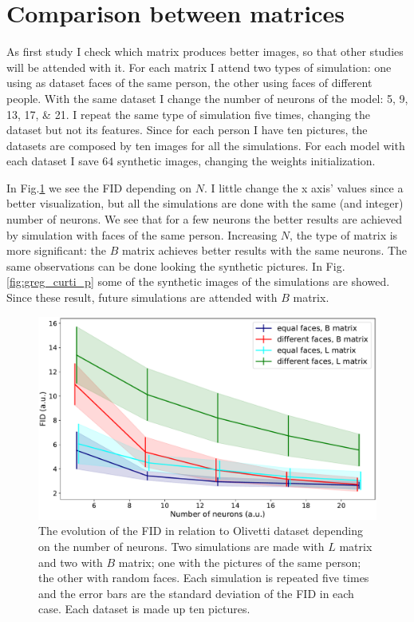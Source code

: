 \documentclass[a4paper,12pt]{article}
\begin{document}
\section{Comparison between matrices}
As first study I check which matrix produces better images, so that other studies will be attended with it.
For each matrix I attend two types of simulation: one using as dataset faces of the same person, the other using faces of different people.
With the same dataset I change the number of neurons of the model: \numlist{5;9;13;17;21}.
I repeat the same type of simulation five times, changing the dataset but not its features.
Since for each person I have ten pictures, the datasets are composed by ten images for all the simulations.
For each model with each dataset I save $64$ synthetic images, changing the weights initialization.

In Fig.\ref{fig:greg_curti_g} we see the FID depending on $N$.
I little change the x axis' values since a better visualization, but all the simulations are done with the same (and integer) number of neurons.
We see that for a few neurons the better results are achieved by simulation with faces of the same person.
Increasing $N$, the type of matrix is more significant: the $B$ matrix achieves better results with the same neurons.
The same observations can be done looking the synthetic pictures.
In Fig.\ref{fig:greg_curti_p} some of the synthetic images of the simulations are showed.
Since these result, future simulations are attended with $B$ matrix.

\begin{figure}[!hbt]
  \centering
  \includegraphics[width=.9\columnwidth]{greg_curti.pdf}
  \caption[FID of $L$ versus $B$ matrix]{The evolution of the FID in relation to Olivetti dataset depending on the number of neurons.
  Two simulations are made with $L$ matrix and two with $B$ matrix; one with the pictures of the same person; the other with random faces.
  Each simulation is repeated five times and the error bars are the standard deviation of the FID in each case.
  Each dataset is made up ten pictures.
  }
  \label{fig:greg_curti_g}
\end{figure}
\end{document}
